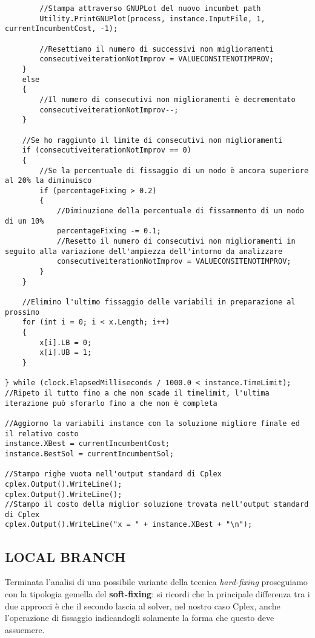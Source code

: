 \documentclass[11pt]{article}
\begin{document}
\begin{lstlisting}
        //Stampa attraverso GNUPLot del nuovo incumbet path
        Utility.PrintGNUPlot(process, instance.InputFile, 1, currentIncumbentCost, -1);

        //Resettiamo il numero di successivi non miglioramenti
        consecutiveiterationNotImprov = VALUECONSITENOTIMPROV;
    }
    else
    {
        //Il numero di consecutivi non miglioramenti è decrementato
        consecutiveiterationNotImprov--;
    }

    //Se ho raggiunto il limite di consecutivi non miglioramenti
    if (consecutiveiterationNotImprov == 0)
    {
        //Se la percentuale di fissaggio di un nodo è ancora superiore al 20% la diminuisco
        if (percentageFixing > 0.2)
        {
            //Diminuzione della percentuale di fissammento di un nodo di un 10%
            percentageFixing -= 0.1;
            //Resetto il numero di consecutivi non miglioramenti in seguito alla variazione dell'ampiezza dell'intorno da analizzare
            consecutiveiterationNotImprov = VALUECONSITENOTIMPROV;
        }
    }

    //Elimino l'ultimo fissaggio delle variabili in preparazione al prossimo 
    for (int i = 0; i < x.Length; i++)
    {
        x[i].LB = 0;
        x[i].UB = 1;
    }

} while (clock.ElapsedMilliseconds / 1000.0 < instance.TimeLimit);
//Ripeto il tutto fino a che non scade il timelimit, l'ultima iterazione può sforarlo fino a che non è completa

//Aggiorno la variabili instance con la soluzione migliore finale ed il relativo costo
instance.XBest = currentIncumbentCost;
instance.BestSol = currentIncumbentSol;

//Stampo righe vuota nell'output standard di Cplex
cplex.Output().WriteLine();
cplex.Output().WriteLine();
//Stampo il costo della miglior soluzione trovata nell'output standard di Cplex
cplex.Output().WriteLine("x = " + instance.XBest + "\n");
\end{lstlisting}

\subsection*{LOCAL BRANCH}
\label{sec:LocalBranchS}

Terminata l'analisi di una possibile variante della tecnica \textit{hard-fixing} proseguiamo con la tipologia gemella del \textbf{soft-fixing}: si ricordi che la principale differenza tra i due approcci è che il secondo lascia al solver, nel nostro caso Cplex, anche l'operazione di fissaggio indicandogli solamente la forma che questo deve assuemere.
\end{document}
